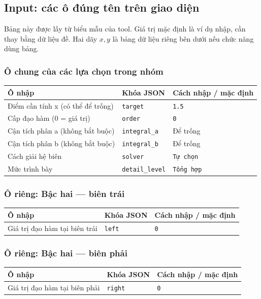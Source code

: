 \subsection*{Input: các ô đúng tên trên giao diện}
Bảng này được lấy từ biểu mẫu của tool. Giá trị mặc định là ví dụ nhập, cần thay bằng dữ liệu đề. Hai dãy $x,y$ là bảng dữ liệu riêng bên dưới nếu chức năng dùng bảng.
\subsubsection*{Ô chung của các lựa chọn trong nhóm}
\begin{center}\small\begin{tabular}{@{}p{.32\linewidth}p{.17\linewidth}p{.43\linewidth}@{}}\toprule
Ô nhập & Khóa JSON & Cách nhập / mặc định\\\midrule
Điểm cần tính x (có thể để trống) & \texttt{target} & \texttt{1.5}\\[3pt]
Cấp đạo hàm (0 = giá trị) & \texttt{order} & \texttt{0}\\[3pt]
Cận tích phân a (không bắt buộc) & \texttt{integral\_a} & Để trống\\[3pt]
Cận tích phân b (không bắt buộc) & \texttt{integral\_b} & Để trống\\[3pt]
Cách giải hệ biên & \texttt{solver} & \texttt{Tự chọn}\\[3pt]
Mức trình bày & \texttt{detail\_level} & \texttt{Tổng hợp}\\[3pt]
\bottomrule\end{tabular}\end{center}
\subsubsection*{Ô riêng: Bậc hai — biên trái}
\begin{center}\small\begin{tabular}{@{}p{.32\linewidth}p{.17\linewidth}p{.43\linewidth}@{}}\toprule
Ô nhập & Khóa JSON & Cách nhập / mặc định\\\midrule
Giá trị đạo hàm tại biên trái & \texttt{left} & \texttt{0}\\[3pt]
\bottomrule\end{tabular}\end{center}
\subsubsection*{Ô riêng: Bậc hai — biên phải}
\begin{center}\small\begin{tabular}{@{}p{.32\linewidth}p{.17\linewidth}p{.43\linewidth}@{}}\toprule
Ô nhập & Khóa JSON & Cách nhập / mặc định\\\midrule
Giá trị đạo hàm tại biên phải & \texttt{right} & \texttt{0}\\[3pt]
\bottomrule\end{tabular}\end{center}
